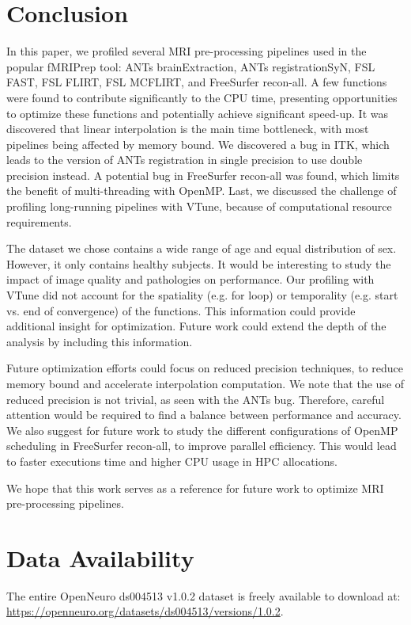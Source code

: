 \documentclass[conference]{IEEEtran}
\begin{document}
\section{Conclusion}
In this paper, we profiled several MRI pre-processing pipelines used in the popular fMRIPrep tool: ANTs brainExtraction, ANTs registrationSyN, FSL FAST, FSL FLIRT, FSL MCFLIRT, and FreeSurfer recon-all. A few functions were found to contribute significantly to the CPU time, presenting opportunities to optimize these functions and potentially achieve significant speed-up. It was discovered that linear interpolation is the main time bottleneck, with most pipelines being affected by memory bound. We discovered a bug in ITK, which leads to the version of ANTs registration in single precision to use double precision instead. A potential bug in FreeSurfer recon-all was found, which limits the benefit of multi-threading with OpenMP. Last, we discussed the challenge of profiling long-running pipelines with VTune, because of computational resource requirements. 

The dataset we chose contains a wide range of age and equal distribution of sex. However, it only contains healthy subjects. It would be interesting to study the impact of image quality and pathologies on performance. Our profiling with VTune did not account for the spatiality (e.g. for loop) or temporality (e.g. start vs. end of convergence) of the functions. This information could provide additional insight for optimization. Future work could extend the depth of the analysis by including this information. 

Future optimization efforts could focus on reduced precision techniques, to reduce memory bound and accelerate interpolation computation. We note that the use of reduced precision is not trivial, as seen with the ANTs bug. Therefore, careful attention would be required to find a balance between performance and accuracy. We also suggest for future work to study the different configurations of OpenMP scheduling in FreeSurfer recon-all, to improve parallel efficiency. This would lead to faster executions time and higher CPU usage in HPC allocations. 

We hope that this work serves as a reference for future work to optimize MRI pre-processing pipelines.

\section{Data Availability}
\label{sec:data-availability}
The entire OpenNeuro ds004513 v1.0.2 dataset is freely available to download at:
\\\href{https://openneuro.org/datasets/ds004513/versions/1.0.2}{https://openneuro.org/datasets/ds004513/versions/1.0.2}.
	
\end{document}
